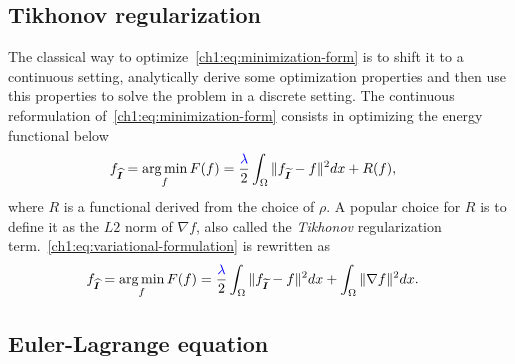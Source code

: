 \subsection{Tikhonov regularization}
\label{ch1:subsec:tikhonov-regularization}
The classical way to optimize~\cref{ch1:eq:minimization-form} is to shift it to a continuous setting, analytically derive some optimization properties and then use this properties to solve the problem in a discrete setting. The continuous reformulation of~\cref{ch1:eq:minimization-form} consists in optimizing the energy functional below
\begin{align}
	f_{\bm{\widehat{I}}} &= \operatorname*{arg\,min}_{f} F(f) = \frac{{\color{blue}{ \lambda }}}{2} \int_{\Omega}{ \lVert f_{\bm{\widetilde{I}}} - f\rVert^2dx} + R(f),
	\label{ch1:eq:variational-formulation}
\end{align}
%
where $R$ is a functional derived from the choice of $\rho$. A popular choice for $R$ is to define it as the $L2$ norm of $\nabla f$, also called the \emph{Tikhonov} regularization term.~\cref{ch1:eq:variational-formulation} is rewritten as
\begin{align}
	f_{\bm{\widehat{I}}} &= \operatorname*{arg\,min}_{f} F(f) = \frac{{\color{blue}{ \lambda }}}{2} \int_{\Omega}{ \lVert f_{\bm{\widetilde{I}}} - f\rVert^2dx} + \int_{\Omega}{ \lVert \nabla f \rVert^2 dx }.
	\label{ch1:tikhonov-formulation}
\end{align}
%
\subsection{Euler-Lagrange equation}

